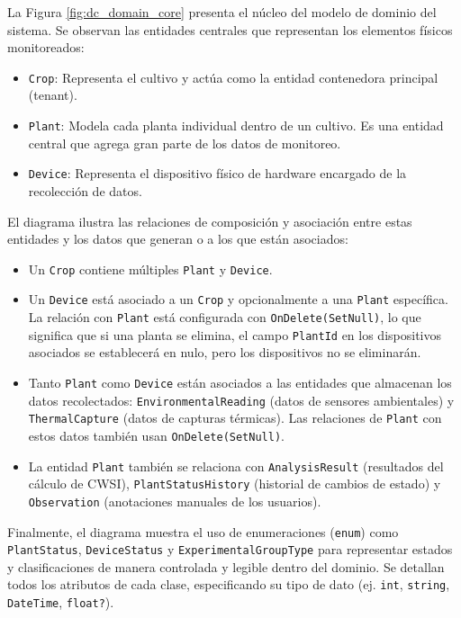 La Figura \ref{fig:dc_domain_core} presenta el núcleo del modelo de dominio del sistema. Se observan las entidades centrales que representan los elementos físicos monitoreados:
\begin{itemize}
    \item \texttt{Crop}: Representa el cultivo y actúa como la entidad contenedora principal (tenant).
    \item \texttt{Plant}: Modela cada planta individual dentro de un cultivo. Es una entidad central que agrega gran parte de los datos de monitoreo.
    \item \texttt{Device}: Representa el dispositivo físico de hardware encargado de la recolección de datos.
\end{itemize}

El diagrama ilustra las relaciones de composición y asociación entre estas entidades y los datos que generan o a los que están asociados:
\begin{itemize}
    \item Un \texttt{Crop} contiene múltiples \texttt{Plant} y \texttt{Device}.
    \item Un \texttt{Device} está asociado a un \texttt{Crop} y opcionalmente a una \texttt{Plant} específica. La relación con \texttt{Plant} está configurada con \texttt{OnDelete(SetNull)}, lo que significa que si una planta se elimina, el campo \texttt{PlantId} en los dispositivos asociados se establecerá en nulo, pero los dispositivos no se eliminarán.
    \item Tanto \texttt{Plant} como \texttt{Device} están asociados a las entidades que almacenan los datos recolectados: \texttt{EnvironmentalReading} (datos de sensores ambientales) y \texttt{ThermalCapture} (datos de capturas térmicas). Las relaciones de \texttt{Plant} con estos datos también usan \texttt{OnDelete(SetNull)}.
    \item La entidad \texttt{Plant} también se relaciona con \texttt{AnalysisResult} (resultados del cálculo de CWSI), \texttt{PlantStatusHistory} (historial de cambios de estado) y \texttt{Observation} (anotaciones manuales de los usuarios).
\end{itemize}

Finalmente, el diagrama muestra el uso de enumeraciones (\texttt{enum}) como \texttt{PlantStatus}, \texttt{DeviceStatus} y \texttt{ExperimentalGroupType} para representar estados y clasificaciones de manera controlada y legible dentro del dominio. Se detallan todos los atributos de cada clase, especificando su tipo de dato (ej. \texttt{int}, \texttt{string}, \texttt{DateTime}, \texttt{float?}).


